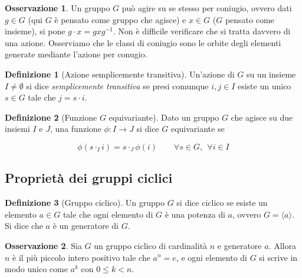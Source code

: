 \documentclass[11pt]{article}
\theoremstyle{plain}
\theoremstyle{definition}
\newtheorem{defn}{Definizione}[section]
\newtheorem*{rem}{Osservazione}
\theoremstyle{remark}
\begin{document}
\begin{rem}
	Un gruppo $G$ può agire su se stesso per coniugio, ovvero dati $g\in G$ (qui $G$ è pensato come gruppo che agisce) e $x\in G$ ($G$ pensato come insieme),
	si pone $g\cdot x = gxg^{-1}$. Non è difficile verificare che si tratta davvero di una azione.
	Osserviamo che le classi di coniugio sono le orbite degli elementi generate mediante l'azione per conugio.
\end{rem}




\begin{defn}[Azione semplicemente transitiva]
Un'azione di $G$ su un insieme $I\neq \emptyset$ si dice \textit{semplicemente transitiva}
se presi comunque $i,j\in I$ esiste un unico $s\in G$ tale che $j=s\cdot i$.
\end{defn}


\begin{defn}[Funzione $G$ equivariante]

Dato un gruppo $G$ che agisce su due insiemi $I$ e $J$, una funzione $\phi: I \to J$ si dice $G$ equivariante se 

\[ \phi(s \cdot_I i) = s \cdot_J \phi(i) \qquad \forall s \in G, \ \ \forall i \in I \]


\end{defn}


















\newpage
\subsection{Proprietà dei gruppi ciclici}

\begin{defn}[Gruppo ciclico] Un gruppo $G$ si dice ciclico se esiste un elemento $a\in G$ tale che ogni
elemento di $G$ è una potenza di $a$, ovvero $G=\langle a\rangle$. Si dice che $a$ è un generatore di $G$.
\end{defn}

\begin{rem}
Sia $G$ un gruppo ciclico di cardinalità $n$ e generatore $a$. Allora $n$ è il più piccolo intero positivo tale che $a^n = e$,
e ogni elemento di $G$ si scrive in modo unico come $a^k$ con $0\le k < n$.
\end{rem}
\end{document}
